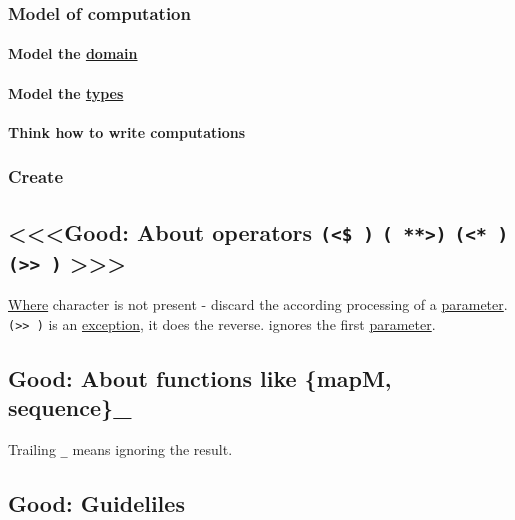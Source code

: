 \documentclass[11pt]{article}
\begin{document}
\subsubsection{Model of computation}
\label{sec:orge36a85d}

\paragraph{Model the \hyperref[orgf784585]{domain}}
\label{sec:org31d9964}

\paragraph{Model the \hyperref[org3927fd9]{types}}
\label{sec:org41059d0}

\paragraph{Think how to write computations}
\label{sec:org0784ab1}

\subsubsection{Create}
\label{sec:org8d0efb4}

\subsection{<<<Good: About operators \texttt{(<\$ )} \texttt{( **>)} \texttt{(<* )} \texttt{(>> )} >>>}
\label{sec:org2358e7f}
\hyperref[orgefd1ecd]{Where} character is not present - discard the according processing of a \hyperref[org45d4a16]{parameter}.\\
\texttt{(>> )} is an \hyperref[org15cd20b]{exception}, it does the reverse. ignores the first \hyperref[org45d4a16]{parameter}.\\

\subsection{\label{org8f696d4}Good: About functions like \{mapM, sequence\}\_}
\label{sec:orgbaec975}
Trailing \texttt{\_} means ignoring the result.\\

\subsection{\label{org5eb9446}Good: Guideliles}
\label{sec:orgdefd729}
\end{document}
